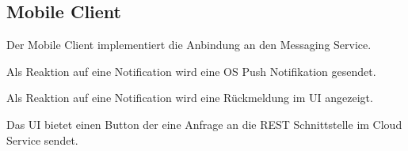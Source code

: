 \subsection{Mobile Client}

Der Mobile Client implementiert die Anbindung an den Messaging Service. 

Als Reaktion auf eine Notification wird eine OS Push Notifikation gesendet. 

Als Reaktion auf eine Notification wird eine Rückmeldung im UI angezeigt. 

Das UI bietet einen Button der eine Anfrage an die REST Schnittstelle im Cloud Service sendet. 



\clearpage
